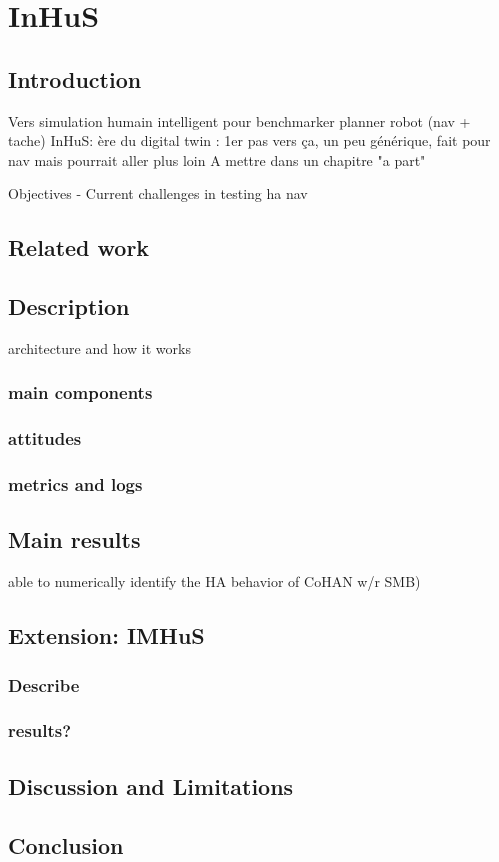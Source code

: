 \ifdefined{}
\else
\setcounter{chapter}{5} %
\dominitoc
\faketableofcontents
\fi

\chapter{InHuS}
\label{chap:6}
\minitoc

\section{Introduction}
Vers simulation humain intelligent pour benchmarker planner robot (nav + tache)
InHuS:
ère du digital twin : 1er pas vers ça, un peu générique, fait pour nav mais pourrait aller plus loin
A mettre dans un chapitre "a part"

Objectives - Current challenges in testing ha nav

\section{Related work}


\section{Description}
architecture and how it works

\subsection{main components}
\subsection{attitudes}
\subsection{metrics and logs}

\section{Main results}
able to numerically identify the HA behavior of CoHAN w/r SMB)


\section{Extension: IMHuS}

\subsection{Describe}
\subsection{results?}

\section{Discussion and Limitations}
\section{Conclusion}